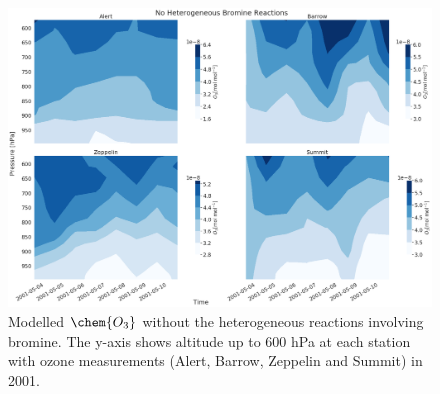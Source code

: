 \begin{figure}
    \centering
    \includegraphics[width = \linewidth]{Chapter6_Results/images/noBr_2001_o3.png}
    \caption{Modelled $\chem{O_3}$ without the heterogeneous reactions involving bromine. The y-axis shows altitude up to 600 hPa at each station with ozone measurements (Alert, Barrow, Zeppelin and Summit) in 2001.}
    \label{fig:vert_noBr_o3_2001}
\end{figure}